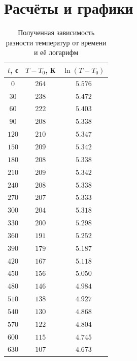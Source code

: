 \documentclass{article}
\begin{document}
\section{Расчёты и графики}


\begin{table}[H]
   \centering
   \begin{tabular}{|c|c|c|} \hline
       $t$, с & $T-T_0$, К  & $\ln(T-T_0)$\\ \hline
        $ 0 $ & $264$       & $5.576$     \\ \hline
        $30 $ & $238$       & $5.472$     \\ \hline
        $60 $ & $222$       & $5.403$     \\ \hline
        $90 $ & $208$       & $5.338$     \\ \hline
        $120$ & $210$       & $5.347$     \\ \hline
        $150$ & $209$       & $5.342$     \\ \hline
        $180$ & $208$       & $5.338$     \\ \hline
        $210$ & $209$       & $5.342$     \\ \hline
        $240$ & $208$       & $5.338$     \\ \hline
        $270$ & $207$       & $5.333$     \\ \hline
        $300$ & $204$       & $5.318$     \\ \hline
        $330$ & $200$       & $5.298$     \\ \hline
        $360$ & $191$       & $5.252$     \\ \hline
        $390$ & $179$       & $5.187$     \\ \hline
        $420$ & $167$       & $5.118$     \\ \hline
        $450$ & $156$       & $5.050$     \\ \hline
        $480$ & $146$       & $4.984$     \\ \hline
        $510$ & $138$       & $4.927$     \\ \hline
        $540$ & $130$       & $4.868$     \\ \hline
        $570$ & $122$       & $4.804$     \\ \hline
        $600$ & $115$       & $4.745$     \\ \hline
        $630$ & $107$       & $4.673$     \\ \hline
   
   \end{tabular}
   \caption{Полученная зависимость разности температур от времени и её логарифм}
\end{table}
\end{document}

